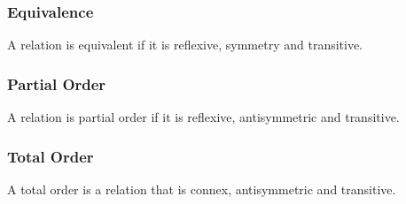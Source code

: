 \documentclass[a4paper]{article}
\theoremstyle{plain}
\theoremstyle{definition}
\newtheorem{defn}{Definition}[section]
\theoremstyle{remark}
\begin{document}
\subsubsection{Equivalence}
\begin{tcolorbox}[colback=black!3!white,colframe=black!60!white,title=\begin{defn}Equivalence \label{Equivalence}\end{defn}]
A relation is equivalent if it is reflexive, symmetry and transitive.
\end{tcolorbox}
\subsubsection{Partial Order}
\begin{tcolorbox}[colback=black!3!white,colframe=black!60!white,title=\begin{defn}Partial Order \label{Partial Order}\end{defn}]
A relation is partial order if it is reflexive, antisymmetric and transitive.
\end{tcolorbox}
\subsubsection{Total Order}
\begin{tcolorbox}[colback=black!3!white,colframe=black!60!white,title=\begin{defn}Total Order \label{Total Order}\end{defn}]
A total order is a relation that is connex, antisymmetric and transitive.
\end{tcolorbox}
\end{document}
